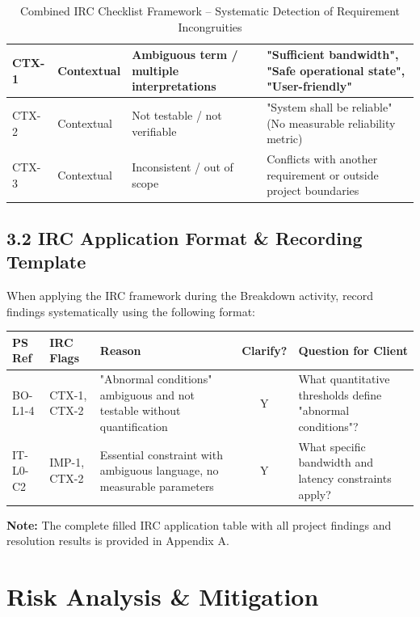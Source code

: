 \documentclass[12pt,a4paper]{article}
\begin{document}
\begin{table}[H]
\begin{tabular}{|>{\raggedright\arraybackslash}p{}|>{\raggedright\arraybackslash}p{}|>{\raggedright\arraybackslash}p{}|>{\raggedright\arraybackslash}p{}|}
\hline
CTX-1 & Contextual & Ambiguous term / multiple interpretations & "Sufficient bandwidth", "Safe operational state", "User-friendly" \\
\hline
CTX-2 & Contextual & Not testable / not verifiable & "System shall be reliable" (No measurable reliability metric) \\
\hline
CTX-3 & Contextual & Inconsistent / out of scope & Conflicts with another requirement or outside project boundaries \\
\hline
\end{tabular}
\caption{Combined IRC Checklist Framework – Systematic Detection of Requirement Incongruities}
\end{table}

\subsection{3.2 IRC Application Format \& Recording Template}

When applying the IRC framework during the Breakdown activity, record findings systematically using the following format:

\begin{center}
\small
\renewcommand{\arraystretch}{1.2}
\begin{tabular}{|>{\raggedright\arraybackslash}p{}|>{\raggedright\arraybackslash}p{}|>{\raggedright\arraybackslash}p{}|c|>{\raggedright\arraybackslash}p{}|}
\hline
\rowcolor{tableheader}
\textbf{PS Ref} & \textbf{IRC Flags} & \textbf{Reason} & \textbf{Clarify?} & \textbf{Question for Client} \\
\hline
BO-L1-4 & CTX-1, CTX-2 & "Abnormal conditions" ambiguous and not testable without quantification & Y & What quantitative thresholds define "abnormal conditions"? \\
\hline
IT-L0-C2 & IMP-1, CTX-2 & Essential constraint with ambiguous language, no measurable parameters & Y & What specific bandwidth and latency constraints apply? \\
\hline
\end{tabular}
\end{center}

\textbf{Note:} The complete filled IRC application table with all project findings and resolution results is provided in Appendix A.

\section{Risk Analysis \& Mitigation}
\label{sec:risks}
\end{document}
